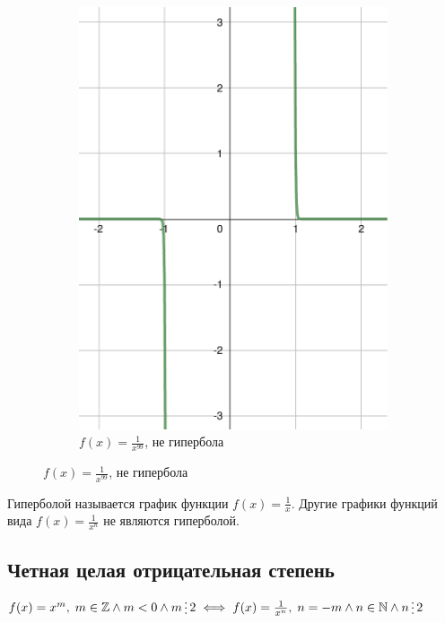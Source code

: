 \begin{figure}[h]
\begin{subfigure}{0.35\textwidth}
        \includegraphics[width=\textwidth]{tex/chapter_2/assets/y=1_div_by_x^99.pdf}
        \caption*{$f(x) = \frac{1}{x^{99}}$, не гипербола}
    \end{subfigure}
\end{figure}

\begin{remark}
    Гиперболой называется график функции $f(x) = \frac{1}{x}$. Другие графики функций вида $f(x) = \frac{1}{x^n}$ не являются гиперболой.
\end{remark}

\subsection{Четная целая отрицательная степень}

$f(x) = x^m, \; m \in \mathbb{Z} \land m < 0 \land m \divisible 2 \iff f(x) = \frac{1}{x^n}, \; n = -m \land n \in \mathbb{N} \land n \divisible 2$ \\

